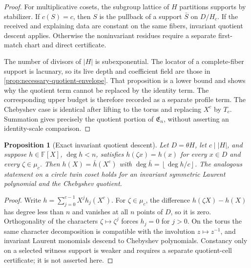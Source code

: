 \documentclass[12pt,a4paper]{amsart}
\numberwithin{equation}{section}
\newtheorem{proposition}[proposition]{Proposition}
\theoremstyle{remark}
\newcommand{\F}{\mathbb F}
\newcommand{\abs}[1]{\lvert #1\rvert}
\newcommand{\floor}[1]{\left\lfloor #1\right\rfloor}
\begin{document}
\begin{proof}
For multiplicative cosets, the subgroup lattice of \(H\) partitions
supports by stabilizer.  If \(c(S)=c\), then \(S\) is the pullback of a
support \(\bar S\) on \(D/H_c\).  If the received and explaining data are
constant on the same fibers, invariant quotient descent applies.  Otherwise the
noninvariant residues require a separate first-match chart and direct
certificate.

The number of divisors of \(\abs H\) is subexponential.  The locator of a
complete-fiber support is lacunary, so its live depth and coefficient field
are those in \cref{prop:necessary-quotient-envelope}.  That proposition is
a lower bound and shows why the quotient term cannot be replaced by the
identity term.  The corresponding upper budget is therefore recorded as a
separate profile term.  The Chebyshev case is identical after lifting to the
torus and replacing \(X^c\) by \(T_c\).  Summation gives precisely the
quotient portion of \(\mathfrak E_n\), without asserting an identity-scale
comparison.
\end{proof}

\begin{proposition}[Exact invariant quotient descent]\label{prop:quotient-descent}
Let \(D=\theta H\), let \(c\mid\abs H\), and suppose
\(h\in\F[X]\), \(\deg h<n\), satisfies \(h(\zeta x)=h(x)\) for every
\(x\in D\) and every \(\zeta\in\mu_c\).  Then
\(h(X)=\bar h(X^c)\) with
\(\deg\bar h=\floor{\deg h/c}\).  The analogous statement on a circle
twin coset holds for an invariant symmetric Laurent polynomial and the
Chebyshev quotient.
\end{proposition}

\begin{proof}
Write \(h=\sum_{j=0}^{c-1}X^jh_j(X^c)\).  For \(\zeta\in\mu_c\), the
difference \(h(\zeta X)-h(X)\) has degree less than \(n\) and vanishes at
all \(n\) points of \(D\), so it is zero.  Orthogonality of the characters
\(\zeta\mapsto\zeta^j\) forces \(h_j=0\) for \(j>0\).  On the torus the
same character decomposition is compatible with the involution
\(z\mapsto z^{-1}\), and invariant Laurent monomials descend to Chebyshev
polynomials.  Constancy only on a selected witness support is weaker and
requires a separate quotient-cell certificate; it is not asserted here.
\end{proof}
\end{document}
